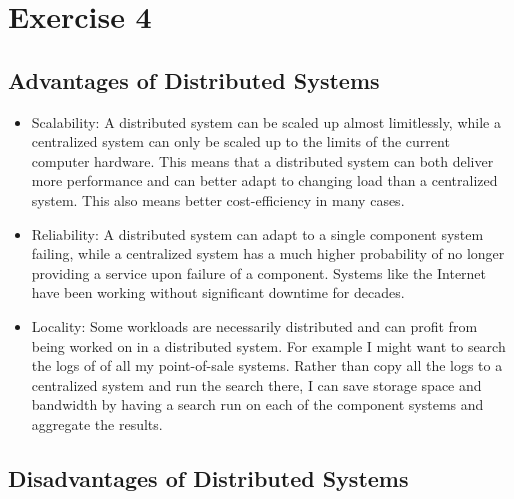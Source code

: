 \documentclass[a4paper]{article}
\begin{document}
\section{Exercise 4}

\subsection{Advantages of Distributed Systems}

\begin{itemize}

    \item Scalability: A distributed system can be scaled up almost limitlessly, while a centralized system can only be scaled up to the limits of the current computer hardware. This means that a distributed system can both deliver more performance and can better adapt to changing load than a centralized system. This also means better cost-efficiency in many cases.

    \item Reliability: A distributed system can adapt to a single component system failing, while a centralized system has a much higher probability of no longer providing a service upon failure of a component. Systems like the Internet have been working without significant downtime for decades.

    \item Locality: Some workloads are necessarily distributed and can profit from being worked on in a distributed system. For example I might want to search the logs of of all my point-of-sale systems. Rather than copy all the logs to a centralized system and run the search there, I can save storage space and bandwidth by having a search run on each of the component systems and aggregate the results.
\end{itemize}

\subsection{Disadvantages of Distributed Systems}
\end{document}
